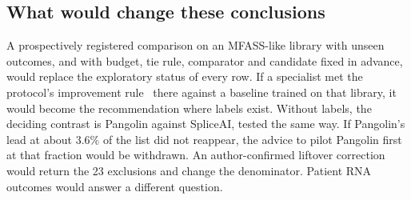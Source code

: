 \documentclass[11pt]{article}
\begin{document}
\subsection{What would change these conclusions}
A prospectively registered comparison on an MFASS-like library with unseen outcomes, and with budget, tie rule,
comparator and candidate fixed in advance, would replace the exploratory status of every row. If a specialist met
the protocol's improvement rule~\citep{rb_protocol} there against a baseline trained on that library, it would
become the recommendation where labels exist. Without labels, the deciding contrast is Pangolin against SpliceAI,
tested the same way. If Pangolin's lead at about 3.6\% of the list did not reappear, the advice to pilot Pangolin
first at that fraction would be withdrawn. An author-confirmed liftover correction would return the 23 exclusions
and change the denominator. Patient RNA outcomes would answer a different question.

\end{document}

